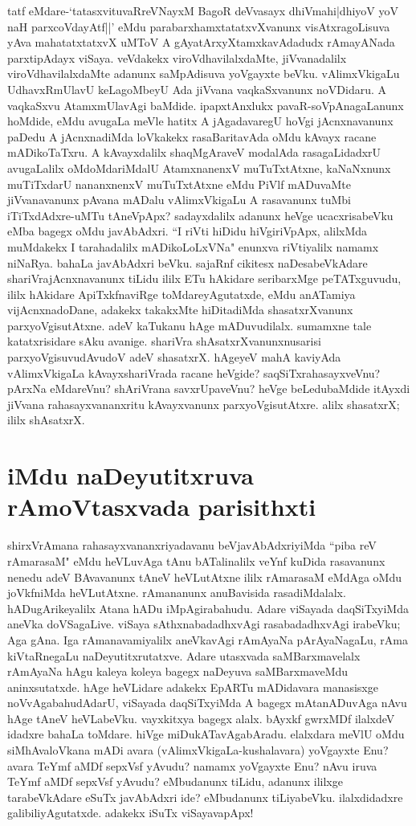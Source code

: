 tatf eMdare-`tatasxvituvaRreVNayxM\label{186} BagoR deVvasayx dhiVmahi|dhiyoV yoV naH parxcoVdayAtf||' eMdu parabarxhamxtatatxvXvanunx visAtxragoLisuva yAva mahatatxtatxvX uMToV A gAyatArxyXtamxkavAdadudx rAmayANada parxtipAdayx viSaya. veVdakekx viroVdhavilalxdaMte, jiVvanadalilx viroVdhavilalxdaMte adanunx saMpAdisuva yoVgayxte beVku. vAlimxVkigaLu UdhavxRmUlavU keLagoMbeyU Ada jiVvana vaqkaSxvanunx noVDidaru. A vaqkaSxvu AtamxmUlavAgi baMdide. ipapxtAnxlukx pavaR-soVpAnagaLanunx hoMdide, eMdu avugaLa meVle hatitx A jAgadavaregU hoVgi jAcnxnavanunx paDedu A jAcnxnadiMda loVkakekx rasaBaritavAda oMdu kAvayx racane mADikoTaTxru. A kAvayxdalilx shaqMgAraveV modalAda rasagaLidadxrU avugaLalilx oMdoMdariMdalU AtamxnanenxV muTuTxtAtxne, kaNaNxnunx muTiTxdarU nananxnenxV muTuTxtAtxne eMdu PiVlf mADuvaMte jiVvanavanunx pAvana mADalu vAlimxVkigaLu A rasavanunx tuMbi iTiTxdAdxre-uMTu tAneVpApx? sadayxdalilx adanunx heVge ucacxrisabeVku eMba bagegx oMdu javAbAdxri. ``I riVti hiDidu hiVgiriVpApx, alilxMda muMdakekx I tarahadalilx mADikoLoLxVNa" enunxva riVtiyalilx namamx niNaRya. bahaLa javAbAdxri beVku. sajaRnf cikitesx naDesabeVkAdare shariVrajAcnxnavanunx tiLidu ililx ETu hAkidare seribarxMge peTATxguvudu, ililx hAkidare ApiTxkfnaviRge toMdareyAgutatxde, eMdu anATamiya vijAcnxnadoDane, adakekx takakxMte hiDitadiMda shasatxrXvanunx parxyoVgisutAtxne. adeV kaTukanu hAge mADuvudilalx. sumamxne tale katatxrisidare sAku avanige. shariVra shAsatxrXvanunxnusarisi parxyoVgisuvudAvudoV adeV shasatxrX. hAgeyeV mahA kaviyAda vAlimxVkigaLa kAvayxshariVrada racane heVgide? saqSiTxrahasayxveVnu? pArxNa eMdareVnu? shAriVrana savxrUpaveVnu? heVge beLedubaMdide itAyxdi jiVvana rahasayxvananxritu kAvayxvanunx parxyoVgisutAtxre. alilx shasatxrX; ililx shAsatxrX. 

\section*{iMdu naDeyutitxruva rAmoVtasxvada parisithxti} 

shirxVrAmana rahasayxvananxriyadavanu beVjavAbAdxriyiMda ``piba reV rAmarasaM"\label{187} eMdu heVLuvAga tAnu bATalinalilx veYnf kuDida rasavanunx nenedu adeV BAvavanunx tAneV heVLutAtxne ililx rAmarasaM eMdAga oMdu joVkfniMda heVLutAtxne. rAmananunx anuBavisida rasadiMdalalx. hADugArikeyalilx Atana hADu iMpAgirabahudu. Adare viSayada daqSiTxyiMda aneVka doVSagaLive. viSaya sAthxnabadadhxvAgi rasabadadhxvAgi irabeVku; Aga gAna. Iga rAmanavamiyalilx aneVkavAgi rAmAyaNa pArAyaNagaLu, rAma kiVtaRnegaLu naDeyutitxrutatxve. Adare utasxvada saMBarxmavelalx rAmAyaNa hAgu kaleya koleya bagegx naDeyuva saMBarxmaveMdu aninxsutatxde. hAge heVLidare adakekx EpARTu mADidavara manasisxge noVvAgabahudAdarU, viSayada daqSiTxyiMda A bagegx mAtanADuvAga nAvu hAge tAneV heVLabeVku. vayxkitxya bagegx alalx. bAyxkf gwrxMDf ilalxdeV idadxre bahaLa toMdare. hiVge miDukATavAgabAradu. elalxdara meVlU oMdu siMhAvaloVkana mADi avara (vAlimxVkigaLa-kushalavara) yoVgayxte Enu? avara TeYmf aMDf sepxVsf yAvudu? namamx yoVgayxte Enu? nAvu iruva TeYmf aMDf sepxVsf yAvudu? eMbudanunx tiLidu, adanunx ililxge tarabeVkAdare eSuTx javAbAdxri ide? eMbudanunx tiLiyabeVku. ilalxdidadxre galibiliyAgutatxde. adakekx iSuTx viSayavapApx! 

